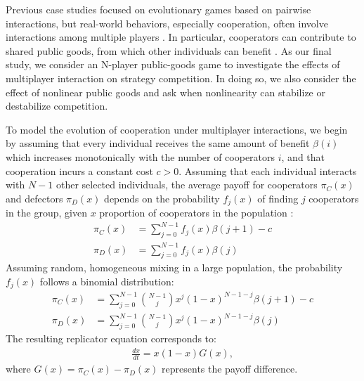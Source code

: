 \documentclass[12pt]{article}
\begin{document}
Previous case studies focused on evolutionary games based on pairwise interactions, but real-world behaviors, especially cooperation, often involve interactions among multiple players \citep{hamburger1973n,fox1978public,motro1991co,archetti2012game,alvarez2021evolutionary}.
In particular, cooperators can contribute to shared public goods, from which other individuals can benefit \citep{szabo2002phase,hauser2019social,hauert2024frequency,sheng2026cooperation}.
As our final study, we consider an N-player public-goods game to investigate the effects of multiplayer interaction on strategy competition.
In doing so, we also consider the effect of nonlinear public goods and ask when nonlinearity can stabilize or destabilize competition.

To model the evolution of cooperation under multiplayer interactions,
we begin by assuming that every individual receives the same amount of benefit $\beta(i)$ which increases monotonically with the number of cooperators $i$, and that cooperation incurs a constant cost $c > 0$.
Assuming that each individual interacts with $N-1$ other selected individuals, the average payoff for cooperators $\pi_C(x)$ and defectors $\pi_D(x)$ depends on the probability $f_j(x)$ of finding $j$ cooperators in the group, given $x$ proportion of cooperators in the population \citep{archetti2012game}:
\begin{align}
\pi_C(x) &= \sum_{j=0}^{N-1} f_j(x)\beta(j+1) -c\\
\pi_D(x) &= \sum_{j=0}^{N-1} f_j(x)\beta(j)
\end{align}
Assuming random, homogeneous mixing in a large population, the probability $f_j(x)$ follows a binomial distribution:
\begin{align}
\pi_C(x) &= \sum_{j=0}^{N-1} \binom{N-1}{j} x^j (1-x)^{N-1-j} \beta(j+1) -c\\
\pi_D(x) &= \sum_{j=0}^{N-1} \binom{N-1}{j} x^j (1-x)^{N-1-j}  \beta(j)
\end{align}
The resulting replicator equation corresponds to:
\begin{align}
\frac{dx}{dt} = x(1-x) G(x),
\end{align}
where $G(x) = \pi_C(x)-\pi_D(x)$ represents the payoff difference.
\end{document}
